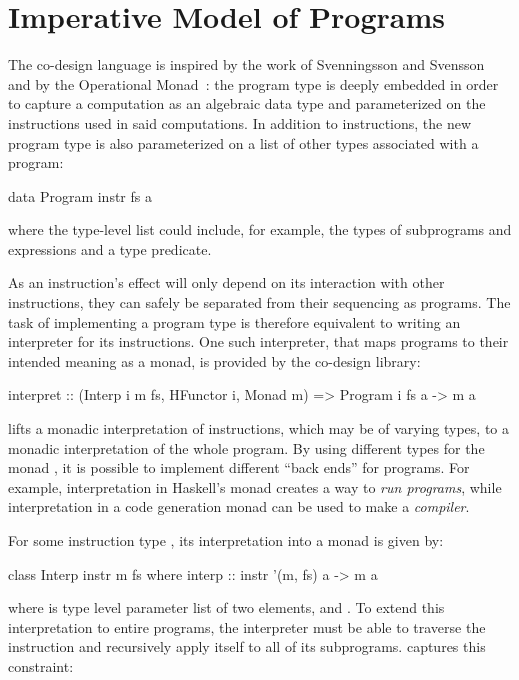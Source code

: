 \documentclass[../paper.tex]{subfiles}
\begin{document}
\section{Imperative Model of Programs}
\label{instr}

The co-design language is inspired by the work of Svenningsson and Svensson~\cite{BjornBenny} and by the Operational Monad~\cite{Operational}: the program type is deeply embedded in order to capture a computation as an algebraic data type and parameterized on the instructions used in said computations. In addition to instructions, the new program type is also parameterized on a list of other types associated with a program:

\begin{code}
data Program instr fs a
\end{code}

\noindent where the type-level list  could include, for example, the types of subprograms and expressions and a type predicate.

As an instruction's effect will only depend on its interaction with other instructions, they can safely be separated from their sequencing as programs. The task of implementing a program type is therefore equivalent to writing an interpreter for its instructions. One such interpreter, that maps programs to their intended meaning as a monad, is provided by the co-design library:

\begin{code}
interpret :: (Interp i m fs, HFunctor i, Monad m) => Program i fs a -> m a
\end{code}

 lifts a monadic interpretation of instructions, which may be of varying types, to a monadic interpretation of the whole program. By using different types for the monad , it is possible to implement different ``back ends'' for programs. For example, interpretation in Haskell's  monad creates a way to \emph{run programs}, while interpretation in a code generation monad can be used to make a \emph{compiler}.

For some instruction type , its interpretation into a monad  is given by:

\begin{code}
class Interp instr m fs where
  interp :: instr '(m, fs) a -> m a
\end{code}

\noindent where  is type level parameter list of two elements,  and . To extend this interpretation to entire programs, the interpreter must be able to traverse the instruction and recursively apply itself to all of its subprograms.  captures this constraint:
\end{document}
